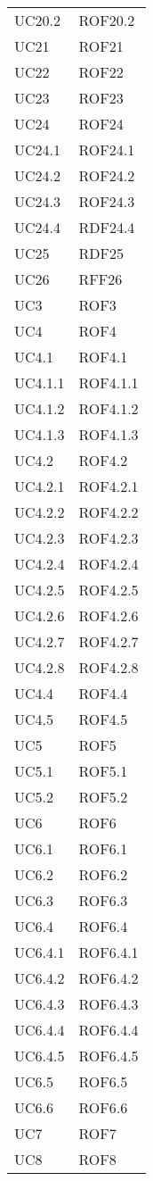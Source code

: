 \begin{longtable}{p{2.5cm}!{\VRule[1pt]}p{2.5cm}}
	UC20.2 & ROF20.2\\
	UC21 & ROF21\\
	UC22 & ROF22\\
	UC23 & ROF23\\
	UC24 & ROF24\\
	UC24.1 & ROF24.1\\
	UC24.2 & ROF24.2\\
	UC24.3 & ROF24.3\\
	UC24.4 & RDF24.4\\
	UC25 & RDF25\\
	UC26 & RFF26\\
	UC3 & ROF3\\
	UC4 & ROF4\\
	UC4.1 & ROF4.1\\
	UC4.1.1 & ROF4.1.1\\
	UC4.1.2 & ROF4.1.2\\
	UC4.1.3 & ROF4.1.3\\
	UC4.2 & ROF4.2\\
	UC4.2.1 & ROF4.2.1\\
	UC4.2.2 & ROF4.2.2\\
	UC4.2.3 & ROF4.2.3\\
	UC4.2.4 & ROF4.2.4\\
	UC4.2.5 & ROF4.2.5\\
	UC4.2.6 & ROF4.2.6\\
	UC4.2.7 & ROF4.2.7\\
	UC4.2.8 & ROF4.2.8\\
	UC4.4 & ROF4.4\\
	UC4.5 & ROF4.5\\
	UC5 & ROF5\\
	UC5.1 & ROF5.1\\
	UC5.2 & ROF5.2\\
	UC6 & ROF6\\
	UC6.1 & ROF6.1\\
	UC6.2 & ROF6.2\\
	UC6.3 & ROF6.3\\
	UC6.4 & ROF6.4\\
	UC6.4.1 & ROF6.4.1\\
	UC6.4.2 & ROF6.4.2\\
	UC6.4.3 & ROF6.4.3\\
	UC6.4.4 & ROF6.4.4\\
	UC6.4.5 & ROF6.4.5\\
	UC6.5 & ROF6.5\\
	UC6.6 & ROF6.6\\
	UC7 & ROF7\\
	UC8 & ROF8\\

\end{longtable}
